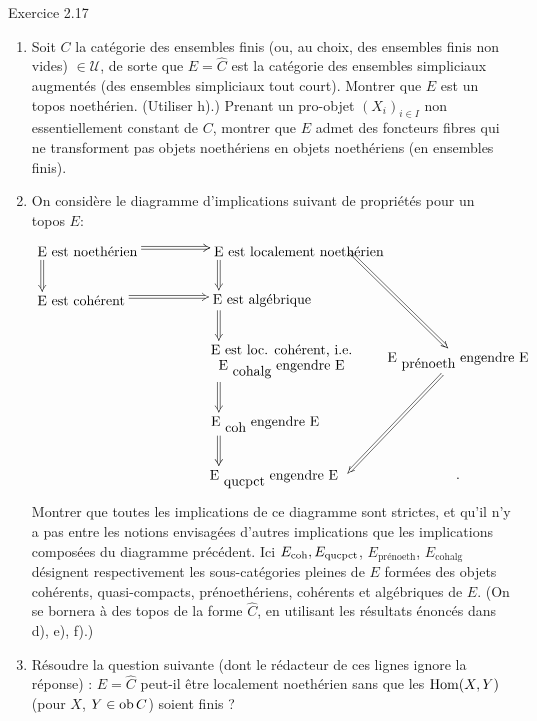 \documentclass[10pt]{../fichiers-configuration-latex/smfart}
\begin{document}
\begin{enonce*}[remark]{Exercice 2.17}
\begin{enumerate}
\item Soit $C$ la catégorie des ensembles finis (ou, au choix, des
  ensembles finis non vides) $\in 𝒰$, de sorte que $E = \widehat{C}$
  est la catégorie des ensembles simpliciaux augmentés (\resp des
  ensembles simpliciaux tout court). Montrer que $E$ est un topos
  noethérien. (Utiliser h).) Prenant un pro-objet $(X_i)_{i \in I}$
  non essentiellement constant de $C$, montrer que $E$ admet des
  foncteurs fibres qui ne transforment pas objets noethériens en
  objets noethériens (\ie en ensembles finis).

\item On considère le diagramme d'implications suivant de propriétés
  pour un topos $E$:
\[
\xymatrix@R=.75cm{
**[r]\txt{E est noethérien} \ar@{=>}[d] \ar@{=>}[r]& **[r]\txt{E est
  localement  noethérien} \ar@{=>}[d] & \ar@{=>}[rdd]\\
**[r]\txt{E est cohérent} \ar@{=>}[r] & **[r]\txt{E
est algébrique} \ar@{=>}[d]\\
 & **[r]\txt<9.5pc>{E est loc. cohérent, i.e.\\E \raisebox{-1ex}{cohalg}
  engendre E} \ar@{=>}[d]& & \txt{E \raisebox{-1ex}{prénoeth} engendre
  E} \ar@{=>}[ldd] \\
 & **[r]\txt{E \raisebox{-1ex}{coh} engendre E} \ar@{=>}[d]&\\
 & **[r]\txt{E \raisebox{-1ex}{qucpct} engendre E}  &&.\\
}
\]
Montrer que toutes les implications de ce diagramme sont strictes,
et qu'il n'y a pas entre les notions envisagées d'autres implications
que les implications composées du diagramme précédent. Ici $E_{\mathrm{coh}},
E_{\text{qucpct}}$, $E_{\text{prénoeth}}$,
$E_{\text{cohalg}}$\pageoriginale
désignent respectivement les sous-catégories pleines de $E$ formées des objets cohérents, \resp
quasi-compacts, \resp prénoethériens, \resp cohérents et algébriques de
$E$. (On se bornera à des topos de la forme $\widehat{C}$, en
utilisant les résultats énoncés dans d), e), f).)

\item Résoudre la question suivante (dont le rédacteur de ces lignes
  ignore la réponse) : $E = \widehat{C}$ peut-il être localement
  noethérien sans que les $\operatorname{Hom}(X, Y)$ (pour $X$, $Y \in \operatorname{ob} C$) soient
  finis ?
\end{enumerate}
\end{enonce*}
\end{document}
